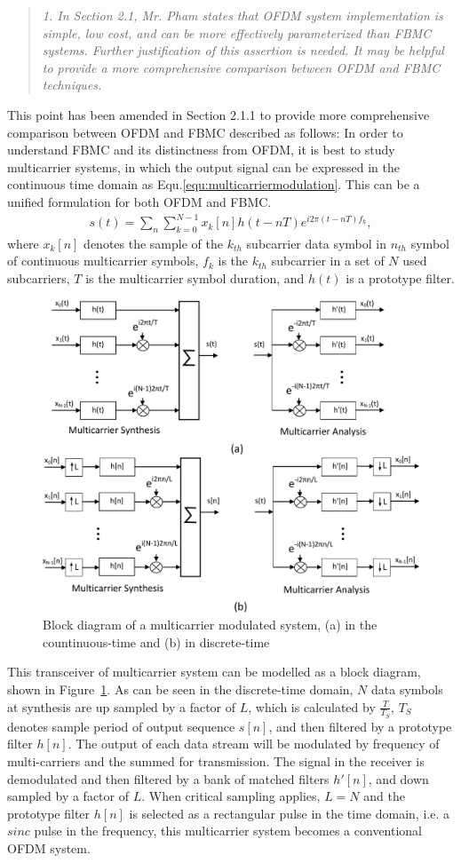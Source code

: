 \documentclass{article}
\begin{document}
\begin{quote}
\emph{1. In Section 2.1, Mr. Pham states that OFDM system implementation is simple, low cost, and can be more effectively parameterized than FBMC systems. Further justification of this assertion is needed. It may be helpful to provide a more comprehensive comparison between OFDM and FBMC techniques.}
\end{quote}
This point has been amended in Section 2.1.1 to provide more comprehensive comparison between OFDM and FBMC described as follows:
In order to understand FBMC and its distinctness from OFDM, it is best to study multicarrier systems, in which the output signal can be expressed in the continuous time domain as Equ.\ref{equ:multicarriermodulation}.
This can be a unified formulation for both OFDM and FBMC.
\begin{eqnarray}
\label{equ:multicarriermodulation}
s(t) = \sum_{n}\sum_{k  = 0}^{N-1} x_{k}[n] h(t-nT)e^{i2\pi (t-nT)f_{k}},
\end{eqnarray}
where $x_{k}[n]$ denotes the sample of the $k_{th}$ subcarrier data symbol in $n_{th}$ symbol of continuous multicarrier symbols, $f_{k}$ is the $k_{th}$ subcarrier in a set of $N$ used subcarriers, $T$ is the multicarrier symbol duration, and $h(t)$ is a prototype filter.
\begin{figure}[b]
	\centerline{\includegraphics [width=0.8\columnwidth] {../Figures/multucarrier_system} }
	\caption{Block diagram of a multicarrier modulated system, (a) in the countinuous-time and (b) in discrete-time}
	\label{fig:multicarrier-block}
\end{figure}
This transceiver of multicarrier system can be modelled as a block diagram, shown in Figure~\ref{fig:multicarrier-block}.
As can be seen in the discrete-time domain, $N$ data symbols at synthesis are up sampled by a factor of $L$, which is calculated by $\frac{T}{T_{S}}$, $T_{S}$ denotes sample period of output sequence $s[n]$, and then filtered by a prototype filter $h[n]$. The output of each data stream will be modulated by frequency of multi-carriers and the summed for transmission.
The signal in the receiver is demodulated and then filtered by a bank of matched filters $h'[n]$, and down sampled by a factor of $L$.
When critical sampling applies, $L = N$ and the prototype filter $h[n]$ is selected as a rectangular pulse in the time domain, i.e. a $sinc$ pulse in the frequency, this multicarrier system becomes a conventional OFDM system.
\end{document}
